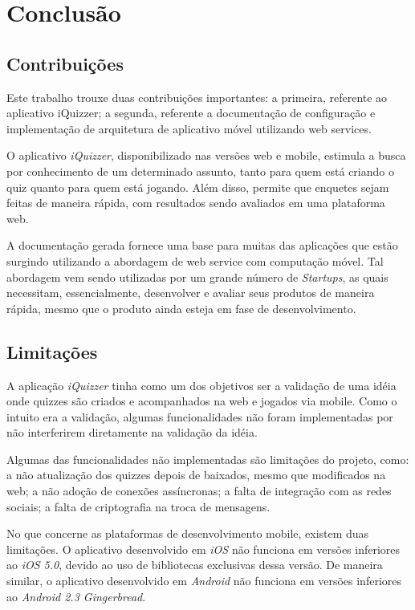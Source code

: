 \chapter{Conclusão} \label{CHP:CONC}


\section{Contribuições}
	Este trabalho trouxe duas contribuições importantes: a primeira, referente ao aplicativo iQuizzer; a segunda, referente a documentação de configuração e implementação de arquitetura de aplicativo móvel utilizando web services.
	
	O aplicativo \emph{iQuizzer}, disponibilizado nas versões web e mobile, estimula a busca por conhecimento de um determinado assunto, tanto para quem está criando o quiz quanto para quem está jogando. Além disso, permite que enquetes sejam feitas de maneira rápida, com resultados sendo avaliados em uma plataforma web.
	
	A documentação gerada fornece uma base para muitas das aplicações que estão surgindo utilizando a abordagem de web service com computação móvel. Tal abordagem vem sendo utilizadas por um grande número de \emph{Startups}, as quais necessitam, essencialmente, desenvolver e avaliar seus produtos de maneira rápida, mesmo que o produto ainda esteja em fase de desenvolvimento.

\section{Limitações}
	A aplicação \emph{iQuizzer} tinha como um dos objetivos ser a validação de uma idéia onde quizzes são criados e acompanhados na web e jogados via mobile. Como o intuito era a validação, algumas funcionalidades não foram implementadas por não interferirem diretamente na validação da idéia. 
	
	Algumas das funcionalidades não implementadas são limitações do projeto, como: a não atualização dos quizzes depois de baixados, mesmo que modificados na web; a não adoção de conexões assíncronas; a falta de integração com as redes sociais; a falta de criptografia na troca de mensagens.
	
	No que concerne as plataformas de desenvolvimento mobile, existem duas limitações. O aplicativo desenvolvido em \emph{iOS} não funciona em versões inferiores ao \emph{iOS 5.0}, devido ao uso de bibliotecas exclusivas dessa versão. De maneira similar, o aplicativo desenvolvido em \emph{Android} não funciona em versões inferiores ao \emph{Android 2.3 Gingerbread}.
	
